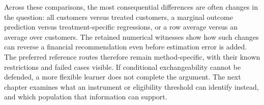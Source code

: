 Across these comparisons, the most consequential differences are often changes
in the question: all customers versus treated customers, a marginal outcome
prediction versus treatment-specific regressions, or a row average versus an
average over customers. The retained numerical witnesses show how such changes
can reverse a financial recommendation even before estimation error is added.
The preferred reference routes therefore remain method-specific, with their
known restrictions and failed cases visible. If conditional exchangeability
cannot be defended, a more flexible learner does not complete the argument.
The next chapter examines what an instrument or eligibility threshold can
identify instead, and which population that information can support.

